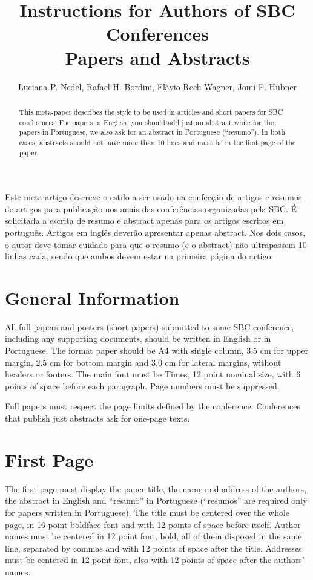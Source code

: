 \documentclass[12pt]{article}
\title{Instructions for Authors of SBC Conferences\\ Papers and Abstracts}
\author{Luciana P. Nedel\inst{1}, Rafael H. Bordini\inst{2}, Flávio Rech Wagner\inst{1}, Jomi F. Hübner\inst{3}}
\begin{document}
\maketitle

\begin{abstract}
  This meta-paper describes the style to be used in articles and short papers for SBC conferences. For papers in English, you should add just an abstract while for the papers in Portuguese, we also ask for an abstract in Portuguese (``resumo''). In both cases, abstracts should not have more than 10 lines and must be in the first page of the paper.
\end{abstract}

\begin{resumo}
  Este meta-artigo descreve o estilo a ser usado na confecção de artigos e resumos de artigos para publicação nos anais das conferências organizadas pela SBC. É solicitada a escrita de resumo e abstract apenas para os artigos escritos em português. Artigos em inglês deverão apresentar apenas abstract. Nos dois casos, o autor deve tomar cuidado para que o resumo (e o abstract) não ultrapassem 10 linhas cada, sendo que ambos devem estar na primeira página do artigo.
\end{resumo}

\section{General Information}
All full papers and posters (short papers) submitted to some SBC conference, including any supporting documents, should be written in English or in Portuguese. The format paper should be A4 with single column, 3.5 cm for upper margin, 2.5 cm for bottom margin and 3.0 cm for lateral margins, without headers or footers. The main font must be Times, 12 point nominal size, with 6 points of space before each paragraph. Page numbers must be suppressed.

Full papers must respect the page limits defined by the conference. Conferences that publish just abstracts ask for one-page texts.

\section{First Page}
The first page must display the paper title, the name and address of the authors, the abstract in English and ``resumo'' in Portuguese (``resumos'' are required only for papers written in Portuguese). The title must be centered over the whole page, in 16 point boldface font and with 12 points of space before itself. Author names must be centered in 12 point font, bold, all of them disposed in the same line, separated by commas and with 12 points of space after the title. Addresses must be centered in 12 point font, also with 12 points of space after the authors' names.
\end{document}

